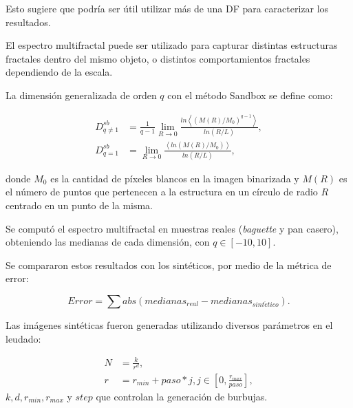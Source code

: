 \documentclass[spanish]{beamer}
\begin{document}
\begin{frame}
Esto sugiere que podría ser útil utilizar más de una DF para caracterizar los resultados.

El espectro multifractal puede ser utilizado para capturar distintas estructuras fractales dentro del mismo objeto, o distintos comportamientos fractales dependiendo de la escala.

La dimensión generalizada de orden $q$ con el método Sandbox se define como:

 \begin{align*}
D_{q\ne 1}^{sb} &= \frac{1}{q-1} \lim_{R \rightarrow 0}{
\frac{ln   { \left\langle  (M(R)/M_{0})^{q-1} \right\rangle   }}
{ln {(R/L)}       }},\\
D_{q=1}^{sb} &= \lim_{R \rightarrow 0}{
\frac{ \left\langle ln   { (M(R)/M_{0})  }  \right\rangle}
{ln {(R/L)}       }},
\end{align*}

\noindent donde $M_{0}$ es la cantidad de píxeles blancos en la imagen binarizada y $M(R)$ es el número de puntos que pertenecen a la estructura en un círculo de radio $R$ centrado en un punto de la misma.
\end{frame}

\begin{frame}
Se computó el espectro multifractal en muestras reales ({\em baguette} y pan casero), obteniendo las medianas de cada dimensión, con $q \in [-10,10]$.

Se compararon estos resultados con los sintéticos, por medio de la métrica de error:

\begin{equation*}
Error = \displaystyle \sum abs(medianas_{real}-medianas_{sint\acute{e}tico}).
\end{equation*}

Las imágenes sintéticas fueron generadas utilizando diversos parámetros en el leudado:

\begin{align*}
N &= \frac{k}{r^{d}},\\ r &= r_{min}+paso*j, j \in [0,\frac{r_{max}}{paso}],
\end{align*}
\noindent $k,d,r_{min},r_{max}$ y $step$ que controlan la generación de burbujas.

\end{frame}
\end{document}
